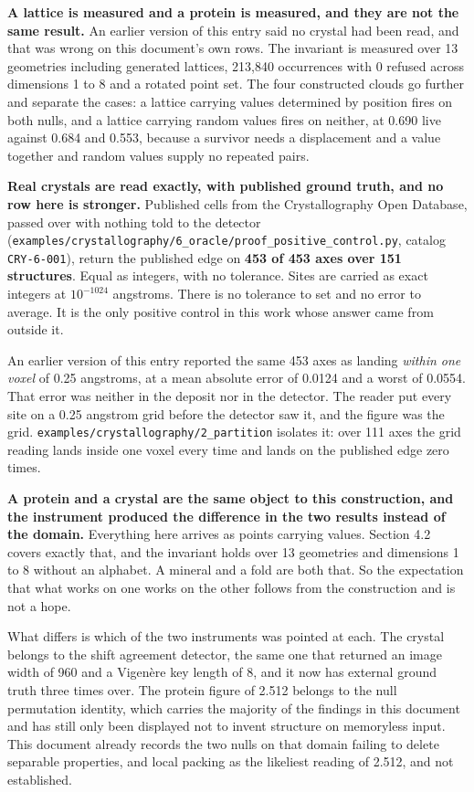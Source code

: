 \textbf{A lattice is measured and a protein is measured, and they are not the same result.} An earlier version of this entry said no crystal had been read, and that was wrong on this document's own rows. The invariant is measured over 13 geometries including generated lattices, 213,840 occurrences with 0 refused across dimensions 1 to 8 and a rotated point set. The four constructed clouds go further and separate the cases: a lattice carrying values determined by position fires on both nulls, and a lattice carrying random values fires on neither, at 0.690 live against 0.684 and 0.553, because a survivor needs a displacement and a value together and random values supply no repeated pairs.

\textbf{Real crystals are read exactly, with published ground truth, and no row here is stronger.} Published cells from the Crystallography Open Database, passed over with nothing told to the detector (\texttt{examples/\allowbreak{}crystallography/\allowbreak{}6\_\allowbreak{}oracle/\allowbreak{}proof\_\allowbreak{}positive\_\allowbreak{}control.\allowbreak{}py}, catalog \texttt{CRY-6-001}), return the published edge on \textbf{453 of 453 axes over 151 structures}. Equal as integers, with no tolerance. Sites are carried as exact integers at \(10^{-1024}\) angstroms. There is no tolerance to set and no error to average. It is the only positive control in this work whose answer came from outside it.

An earlier version of this entry reported the same 453 axes as landing \emph{within one voxel} of 0.25 angstroms, at a mean absolute error of 0.0124 and a worst of 0.0554. That error was neither in the deposit nor in the detector. The reader put every site on a 0.25 angstrom grid before the detector saw it, and the figure was the grid. \texttt{examples/\allowbreak{}crystallography/\allowbreak{}2\_\allowbreak{}partition} isolates it: over 111 axes the grid reading lands inside one voxel every time and lands on the published edge zero times.

\textbf{A protein and a crystal are the same object to this construction, and the instrument produced the difference in the two results instead of the domain.} Everything here arrives as points carrying values. Section 4.2 covers exactly that, and the invariant holds over 13 geometries and dimensions 1 to 8 without an alphabet. A mineral and a fold are both that. So the expectation that what works on one works on the other follows from the construction and is not a hope.

What differs is which of the two instruments was pointed at each. The crystal belongs to the shift agreement detector, the same one that returned an image width of 960 and a Vigenère key length of 8, and it now has external ground truth three times over. The protein figure of 2.512 belongs to the null permutation identity, which carries the majority of the findings in this document and has still only been displayed not to invent structure on memoryless input. This document already records the two nulls on that domain failing to delete separable properties, and local packing as the likeliest reading of 2.512, and not established.

